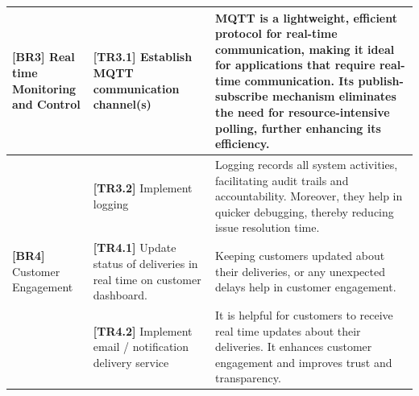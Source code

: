 \documentclass{article}
\begin{document}
\begin{table}[H]
\begin{tabular}{|p{0.2\linewidth}| p{0.3\linewidth} | p{0.5\linewidth} |}
         \textbf{[BR3]} Real time Monitoring and Control&  \textbf{[TR3.1]} Establish MQTT communication channel(s) & MQTT is a lightweight, efficient protocol for real-time communication, making it ideal for applications that require real-time communication. Its publish-subscribe mechanism eliminates the need for resource-intensive polling, further enhancing its efficiency. \cite{MQTT} \\ \hline 
         &  \textbf{[TR3.2]} Implement logging &  Logging records all system activities, facilitating audit trails and accountability. Moreover, they help in quicker debugging, thereby reducing issue resolution time.\cite{Logging} \\ \hline 

         \textbf{[BR4]} Customer Engagement&  \textbf{[TR4.1]} Update status of deliveries in real time on customer dashboard. & Keeping customers updated about their deliveries, or any unexpected delays help in customer engagement.  \\ \hline
          &  \textbf{[TR4.2]} Implement email / notification delivery service &  It is helpful for customers to receive real time updates about their deliveries. It enhances customer engagement and improves trust and transparency. \\ \hline 
    \end{tabular}
\end{table}
\end{document}
